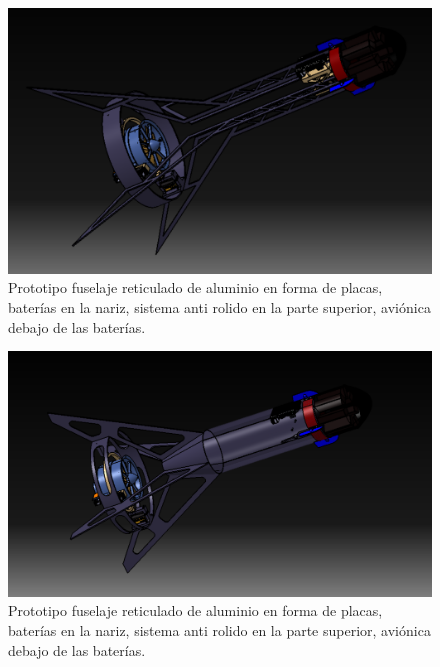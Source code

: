 \begin{figure}[htb]
    \centering
    \includegraphics[width=\linewidth]{fig/design/2}
    \caption{Prototipo fuselaje reticulado de aluminio en forma de placas, baterías en la nariz, sistema anti
    rolido en la parte superior, aviónica debajo de las baterías.}
    \label{fig:design/2}
\end{figure}

\begin{figure}[htb]
    \centering
    \includegraphics[width=\linewidth]{fig/design/3}
    \caption{Prototipo fuselaje reticulado de aluminio en forma de placas, baterías en la nariz, sistema anti
    rolido en la parte superior, aviónica debajo de las baterías.}
    \label{fig:design/3}
\end{figure}

